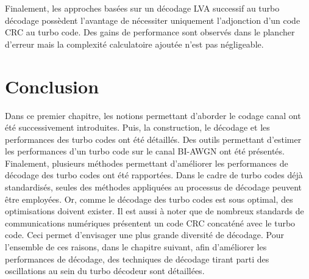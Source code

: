 Finalement, les approches basées sur un décodage LVA successif au turbo décodage possèdent l'avantage de nécessiter uniquement l'adjonction d'un code CRC au turbo code. Des gains de performance sont observés dans le plancher d'erreur mais la complexité calculatoire ajoutée n'est pas négligeable.

\begin{table}[tb]
\centering
\caption{Synthèse des différentes méthodes améliorant les performances de décodage}
\label{tab:recap}
\end{table}

\section{Conclusion}
Dans ce premier chapitre, les notions permettant d'aborder le codage canal ont été successivement introduites. Puis, la construction, le décodage et les performances des turbo codes ont été détaillés. Des outils permettant d'estimer les performances d'un turbo code sur le canal BI-AWGN ont été présentés. Finalement, plusieurs méthodes permettant d'améliorer les performances de décodage des turbo codes ont été rapportées. Dans le cadre de turbo codes déjà standardisés, seules des méthodes appliquées au processus de décodage peuvent être employées. Or, comme le décodage des turbo codes est sous optimal, des optimisations doivent exister. Il est aussi à noter que de nombreux standards de communications numériques présentent un code CRC concaténé avec le turbo code. Ceci permet d'envisager une plus grande diversité de décodage. Pour l'ensemble de ces raisons, dans le chapitre suivant, afin d'améliorer les performances de décodage, des techniques de décodage tirant parti des oscillations au sein du turbo décodeur sont détaillées. 